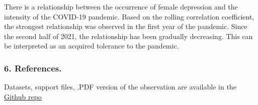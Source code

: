 \documentclass[
]{article}
\begin{document}
There is a relationship between the occurrence of female depression and
the intensity of the COVID-19 pandemic. Based on the rolling correlation
coefficient, the strongest relationship was observed in the first year
of the pandemic. Since the second half of 2021, the relationship has
been gradually decreasing. This can be interpreted as an acquired
tolerance to the pandemic.

\hypertarget{references.}{%
\subsubsection{6. References.}\label{references.}}

Datasets, support files, .PDF version of the observation are available
in the \href{https://github.com/5filipp/SRI_interview.git}{Github repo}
\end{document}
